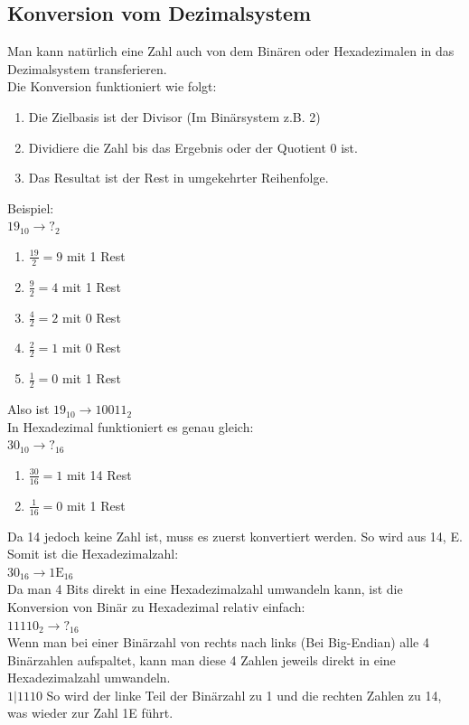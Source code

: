 \documentclass{article}
\begin{document}
	\subsection{Konversion vom Dezimalsystem}
		Man kann natürlich eine Zahl auch von dem Binären oder Hexadezimalen in das Dezimalsystem transferieren. \\
		Die Konversion funktioniert wie folgt:
		\begin{enumerate}
			\item{Die Zielbasis ist der Divisor (Im Binärsystem z.B. 2)}
			\item{Dividiere die Zahl bis das Ergebnis oder der Quotient 0 ist.}
			\item{Das Resultat ist der Rest in umgekehrter Reihenfolge.}
		\end{enumerate}
		Beispiel: \\
		$19_{10} \to ?_2$\\
		\begin{enumerate}
			\item{$\frac{19}{2} = 9$ mit 1 Rest}
			\item{$\frac{9}{2} = 4$ mit 1 Rest}
			\item{$\frac{4}{2} = 2$ mit 0 Rest}
			\item{$\frac{2}{2} = 1$ mit 0 Rest}
			\item{$\frac{1}{2} = 0$ mit 1 Rest}
		\end{enumerate}
		Also ist $19_{10} \to 10011_2$\\
		In Hexadezimal funktioniert es genau gleich: \\
		$30_{10} \to ?_{16}$
		\begin{enumerate}
			\item{$\frac{30}{16} = 1$ mit 14 Rest}
			\item{$\frac{1}{16} = 0$ mit 1 Rest}
		\end{enumerate}
		Da 14 jedoch keine Zahl ist, muss es zuerst konvertiert werden. So wird aus 14, E. Somit ist die Hexadezimalzahl: \\
		$30_{16} \to 1\mathrm{E}_{16}$\\
		Da man 4 Bits direkt in eine Hexadezimalzahl umwandeln kann, ist die Konversion von Binär zu Hexadezimal relativ einfach:\\
		$11110_2 \to ?_{16}$ \\
		Wenn man bei einer Binärzahl von rechts nach links (Bei Big-Endian) alle 4 Binärzahlen aufspaltet, kann man diese 4 Zahlen jeweils direkt in eine Hexadezimalzahl umwandeln. \\
		$1|1110$ So wird der linke Teil der Binärzahl zu 1 und die rechten Zahlen zu 14, was wieder zur Zahl 1E führt. \\
\end{document}
